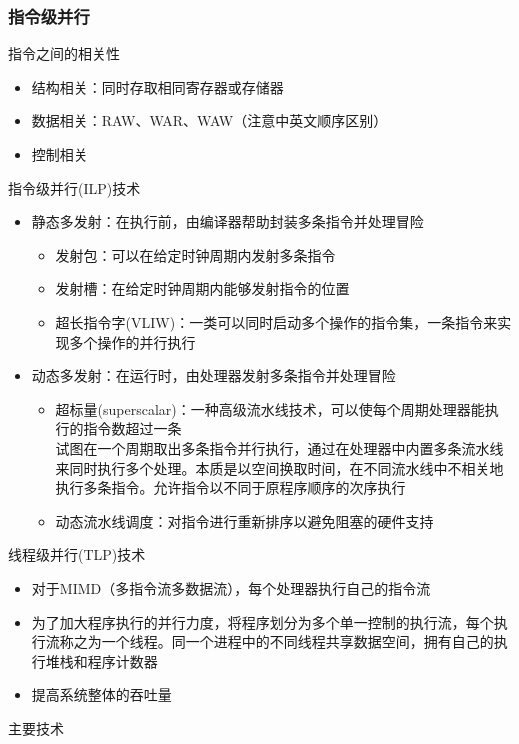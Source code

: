 \subsubsection{指令级并行}
指令之间的相关性
\begin{itemize}
	\item 结构相关：同时存取相同寄存器或存储器
	\item 数据相关：RAW、WAR、WAW（注意中英文顺序区别）
	\item 控制相关
\end{itemize}
\par 指令级并行(ILP)技术
\begin{itemize}
	\item 静态多发射：在执行前，由编译器帮助封装多条指令并处理冒险
	\begin{itemize}
		\item 发射包：可以在给定时钟周期内发射多条指令
		\item 发射槽：在给定时钟周期内能够发射指令的位置
		\item 超长指令字(VLIW)：一类可以同时启动多个操作的指令集，一条指令来实现多个操作的并行执行
	\end{itemize}
	\item 动态多发射：在运行时，由处理器发射多条指令并处理冒险
	\begin{itemize}
		\item 超标量(superscalar)：一种高级流水线技术，可以使每个周期处理器能执行的指令数超过一条\\
	试图在一个周期取出多条指令并行执行，通过在处理器中内置多条流水线来同时执行多个处理。本质是以空间换取时间，在不同流水线中不相关地执行多条指令。允许指令以不同于原程序顺序的次序执行
		\item 动态流水线调度：对指令进行重新排序以避免阻塞的硬件支持
	\end{itemize}
\end{itemize}
\par 线程级并行(TLP)技术
\begin{itemize}
	\item 对于MIMD（多指令流多数据流），每个处理器执行自己的指令流
	\item 为了加大程序执行的并行力度，将程序划分为多个单一控制的执行流，每个执行流称之为一个线程。同一个进程中的不同线程共享数据空间，拥有自己的执行堆栈和程序计数器
	\item 提高系统整体的吞吐量
\end{itemize}
\par 主要技术
